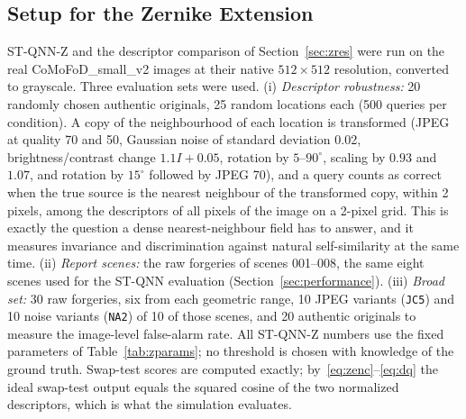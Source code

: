 \documentclass[conference]{IEEEtran}
\begin{document}
\subsection{Setup for the Zernike Extension}\label{sec:zsetup}
ST-QNN-Z and the descriptor comparison of Section~\ref{sec:zres} were run on the real CoMoFoD\_small\_v2 images at their native $512\times512$ resolution, converted to grayscale. Three evaluation sets were used. (i) \emph{Descriptor robustness:} 20 randomly chosen authentic originals, 25 random locations each (500 queries per condition). A copy of the neighbourhood of each location is transformed (JPEG at quality 70 and 50, Gaussian noise of standard deviation 0.02, brightness/contrast change $1.1I + 0.05$, rotation by $5$--$90^\circ$, scaling by $0.93$ and $1.07$, and rotation by $15^\circ$ followed by JPEG 70), and a query counts as correct when the true source is the nearest neighbour of the transformed copy, within 2 pixels, among the descriptors of all pixels of the image on a 2-pixel grid. This is exactly the question a dense nearest-neighbour field has to answer, and it measures invariance and discrimination against natural self-similarity at the same time. (ii) \emph{Report scenes:} the raw forgeries of scenes 001--008, the same eight scenes used for the ST-QNN evaluation (Section~\ref{sec:performance}). (iii) \emph{Broad set:} 30 raw forgeries, six from each geometric range, 10 JPEG variants (\texttt{JC5}) and 10 noise variants (\texttt{NA2}) of 10 of those scenes, and 20 authentic originals to measure the image-level false-alarm rate. All ST-QNN-Z numbers use the fixed parameters of Table~\ref{tab:zparams}; no threshold is chosen with knowledge of the ground truth. Swap-test scores are computed exactly; by~\eqref{eq:zenc}--\eqref{eq:dq} the ideal swap-test output equals the squared cosine of the two normalized descriptors, which is what the simulation evaluates.

\end{document}
